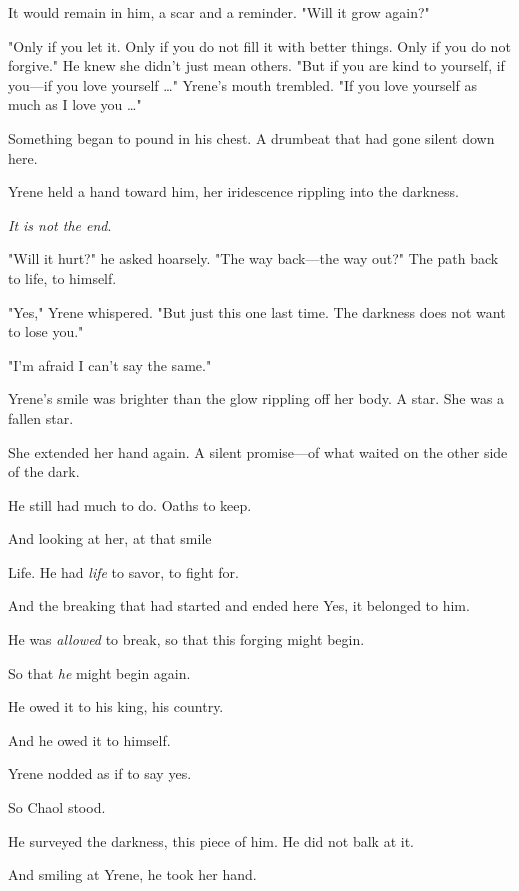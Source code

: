 It would remain in him, a scar and a reminder. "Will it grow again?"

"Only if you let it. Only if you do not fill it with better things. Only if you do not forgive." He knew she didn't just mean others. "But if you are kind to yourself, if you---if you love yourself \ldots" Yrene's mouth trembled. "If you love yourself as much as I love you
\ldots"

Something began to pound in his chest. A drumbeat that had gone silent down here.

Yrene held a hand toward him, her iridescence rippling into the darkness.

\emph{It is not the end}.

"Will it hurt?" he asked hoarsely. "The way back---the way out?" The path back to life, to himself.

"Yes," Yrene whispered. "But just this one last time. The darkness does not want to lose you."

"I'm afraid I can't say the same."

Yrene's smile was brighter than the glow rippling off her body. A star. She was a fallen star.

She extended her hand again. A silent promise---of what waited on the other side of the dark.

He still had much to do. Oaths to keep.

And looking at her, at that smile 

Life. He had \emph{life} to savor, to fight for.

And the breaking that had started and ended here  Yes, it belonged to him.

He was \emph{allowed} to break, so that this forging might begin.

So that \emph{he} might begin again.

He owed it to his king, his country.

And he owed it to himself.

Yrene nodded as if to say yes.

So Chaol stood.

He surveyed the darkness, this piece of him. He did not balk at it.

And smiling at Yrene, he took her hand.

